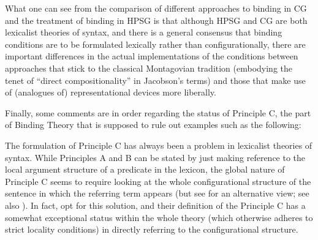 \documentclass[output=paper,biblatex,babelshorthands,newtxmath,draftmode,colorlinks,citecolor=brown]{langscibook}
\begin{document}

What one can see from the comparison of different approaches to binding
in CG and the treatment of binding in HPSG is that although HPSG and
CG are both lexicalist theories of syntax, and there is a general
consensus that binding conditions are to be formulated lexically
rather than configurationally, there are important differences in the
actual implementations of the conditions between approaches that stick to
the classical Montagovian tradition (embodying the tenet of
``direct compositionality'' in Jacobson's terms) and those that make use of
(analogues of) representational devices more liberally.



Finally, some comments are in order regarding the status of
Principle C, the part of Binding Theory that is
supposed to rule out examples such as the following:

\eal
{}
\zl

The formulation of Principle C has always been a problem in lexicalist theories of syntax. While
Principles A and B can be stated by just making reference to the local argument structure of a
predicate in the lexicon, the global nature of Principle C seems to require looking at the whole
configurational structure of the sentence in which the referring term appears (but see
\citet{Branco2002a} for an alternative view; see also ). In fact,
\textcites{PS92a}[Chapter~6]{ps2} opt for this solution, and their definition of the Principle C has
a somewhat exceptional status within the whole theory (which otherwise adheres to strict locality
conditions) in directly referring to the configurational structure.
\end{document}
